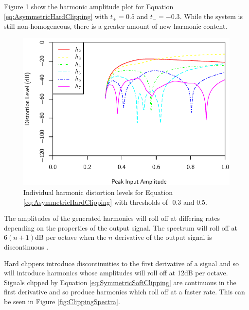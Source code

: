			Figure \ref{fig:AsymmetricHardClippingHarmonics} show the harmonic amplitude plot for Equation
			\ref{eq:AsymmetricHardClipping} with $t_{+} = 0.5$ and $t_{-} = -0.3$. While the system is still
			non-homogeneous, there is a greater amount of new harmonic content.

			\begin{figure}[h!]
				\centering
				\includegraphics{chapter5/Images/AsymmetricHardClippingHarmonics.pdf}
				\caption{Individual harmonic distortion levels for Equation
					 \ref{eq:AsymmetricHardClipping} with thresholds of -0.3 and 0.5.}
				\label{fig:AsymmetricHardClippingHarmonics}
			\end{figure}

			The amplitudes of the generated harmonics will roll off at differing rates depending on the
			properties of the output signal. The spectrum will roll off at $6(n+1)$dB per octave when
			the $n$ derivative of the output signal is discontinuous \citep{kraght2000aliasing}.

			Hard clippers introduce discontinuities to the first derivative of a signal and so will introduce
			harmonics whose amplitudes will roll off at 12dB per octave. Signals clipped by Equation
			\ref{eq:SymmetricSoftClipping} are continuous in the first derivative and so produce harmonics
			which roll off at a faster rate. This can be seen in Figure \ref{fig:ClippingSpectra}.

